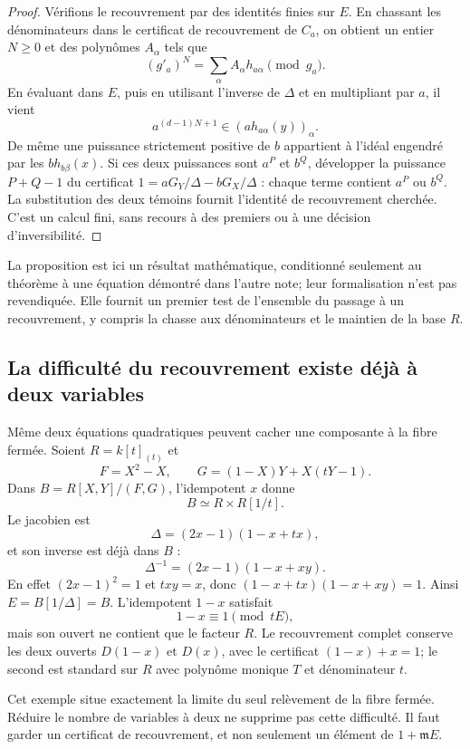 \documentclass[11pt]{amsart}
\newcommand{\m}{\mathfrak m}
\begin{document}
\begin{proof}
Vérifions le recouvrement par des identités finies sur $E$.
En chassant les dénominateurs dans le certificat de recouvrement de
$C_a$, on obtient un entier $N\geq0$ et des polynômes $A_\alpha$
tels que
\[
               (g'_a)^N=\sum_\alpha A_\alpha h_{a\alpha}
                         \pmod{g_a}.
\]
En évaluant dans $E$, puis en utilisant l'inverse de $\Delta$ et
en multipliant par $a$, il vient
\[
                  a^{(d-1)N+1}\in
                       (a h_{a\alpha}(y))_\alpha.
\]
De même une puissance strictement positive de $b$ appartient à
l'idéal engendré par les $b h_{b\beta}(x)$.
Si ces deux puissances sont $a^P$ et $b^Q$, développer la puissance
$P+Q-1$ du certificat $1=aG_Y/\Delta-bG_X/\Delta$ : chaque
terme contient $a^P$ ou $b^Q$. La substitution des deux témoins
fournit l'identité de recouvrement cherchée. C'est un calcul fini,
sans recours à des premiers ou à une décision d'inversibilité.
\end{proof}

La proposition est ici un résultat mathématique, conditionné seulement
au théorème à une équation démontré dans l'autre note; leur
formalisation n'est pas revendiquée. Elle fournit un premier test
de l'ensemble du passage à un recouvrement, y compris la chasse aux
dénominateurs et le maintien de la base $R$.

\subsection{La difficulté du recouvrement existe déjà à deux variables}

Même deux équations quadratiques peuvent cacher une composante à la
fibre fermée. Soient $R=k[t]_{(t)}$ et
\[
 F=X^2-X,\qquad G=(1-X)Y+X(tY-1).
\]
Dans $B=R[X,Y]/(F,G)$, l'idempotent $x$ donne
\[
                         B\simeq R\times R[1/t].
\]
Le jacobien est
\[
              \Delta=(2x-1)(1-x+tx),
\]
et son inverse est déjà dans $B$ :
\[
              \Delta^{-1}=(2x-1)(1-x+xy).
\]
En effet $(2x-1)^2=1$ et $txy=x$, donc
$(1-x+tx)(1-x+xy)=1$. Ainsi $E=B[1/\Delta]=B$.
L'idempotent $1-x$ satisfait
\[
                       1-x\equiv1\pmod{tE},
\]
mais son ouvert ne contient que le facteur $R$. Le recouvrement
complet conserve les deux ouverts $D(1-x)$ et $D(x)$, avec le
certificat $(1-x)+x=1$; le second est standard sur $R$ avec polynôme
monique $T$ et dénominateur $t$.

Cet exemple situe exactement la limite du seul relèvement de la fibre
fermée. Réduire le nombre de variables à deux ne supprime pas cette
difficulté. Il faut garder un certificat de recouvrement, et non
seulement un élément de $1+\m E$.
\end{document}
